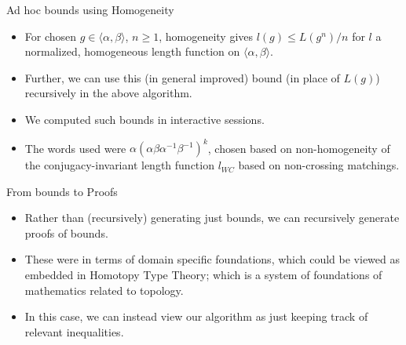 \documentclass[aspectratio=1610,17pt, ucs]{beamer}
\newcommand{\F}{\langle \alpha, \beta \rangle}
\begin{document}
\begin{frame}{Ad hoc bounds using Homogeneity}
  \begin{itemize}[<+->]
    \item For chosen $g\in \F$, $n \geq 1$, homogeneity gives $l(g)\leq L(g^n)/n$ for $l$ a normalized, homogeneous length function on $\F$.
    \item Further, we can use this (in general improved) bound (in place of $L(g)$) recursively in the above algorithm.
    \item We computed such bounds in interactive sessions. 
    \item The words used were $\alpha(\alpha\beta\alpha^{-1}\beta^{-1})^k$, chosen based on non-homogeneity of the conjugacy-invariant length function $l_{WC}$ based on non-crossing matchings.
  \end{itemize}
  
\end{frame}

\begin{frame}{From bounds to Proofs}
  \begin{itemize}
    \item\pause Rather than (recursively) generating just bounds, we can recursively generate \alert{proofs} of bounds.
    \item\pause These were in terms of \alert{domain specific foundations}, which could be viewed as embedded in Homotopy Type Theory; \pause which is a system of foundations of mathematics related to topology.
    \item\pause In this case, we can instead view our algorithm as just keeping track of relevant inequalities.
  \end{itemize}
  
\end{frame}
\end{document}
